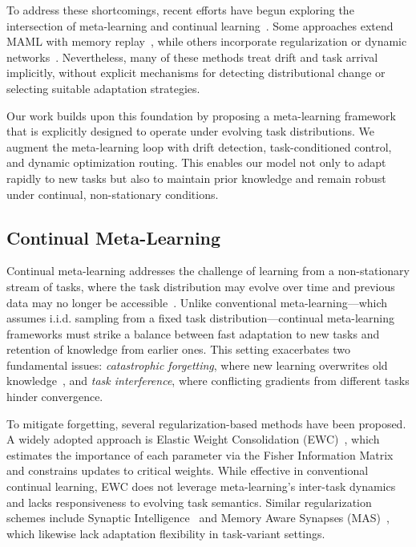 \documentclass[conference]{IEEEtran}
\begin{document}
To address these shortcomings, recent efforts have begun exploring the intersection of meta-learning and continual learning~\cite{rajasegaran2020itaml, jerfel2019reconciling}. Some approaches extend MAML with memory replay~\cite{javed2019meta}, while others incorporate regularization or dynamic networks~\cite{fini2022self}. Nevertheless, many of these methods treat drift and task arrival implicitly, without explicit mechanisms for detecting distributional change or selecting suitable adaptation strategies.

Our work builds upon this foundation by proposing a meta-learning framework that is explicitly designed to operate under evolving task distributions. We augment the meta-learning loop with drift detection, task-conditioned control, and dynamic optimization routing. This enables our model not only to adapt rapidly to new tasks but also to maintain prior knowledge and remain robust under continual, non-stationary conditions.


\subsection{Continual Meta-Learning}

Continual meta-learning addresses the challenge of learning from a non-stationary stream of tasks, where the task distribution may evolve over time and previous data may no longer be accessible~\cite{parisi2019continual}. Unlike conventional meta-learning—which assumes i.i.d. sampling from a fixed task distribution—continual meta-learning frameworks must strike a balance between fast adaptation to new tasks and retention of knowledge from earlier ones. This setting exacerbates two fundamental issues: \emph{catastrophic forgetting}, where new learning overwrites old knowledge~\cite{mccloskey1989catastrophic}, and \emph{task interference}, where conflicting gradients from different tasks hinder convergence.

To mitigate forgetting, several regularization-based methods have been proposed. A widely adopted approach is Elastic Weight Consolidation (EWC)~\cite{kirkpatrick2017overcoming}, which estimates the importance of each parameter via the Fisher Information Matrix and constrains updates to critical weights. While effective in conventional continual learning, EWC does not leverage meta-learning’s inter-task dynamics and lacks responsiveness to evolving task semantics. Similar regularization schemes include Synaptic Intelligence~\cite{zenke2017continual} and Memory Aware Synapses (MAS)~\cite{aljundi2018memory}, which likewise lack adaptation flexibility in task-variant settings.
\end{document}
